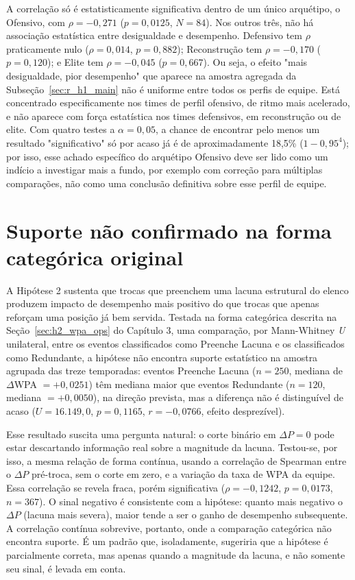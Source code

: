 A correlação só é estatisticamente significativa dentro de um único arquétipo, o Ofensivo, com $\rho = -0{,}271$ ($p = 0{,}0125$, $N = 84$). Nos outros três, não há associação estatística entre desigualdade e desempenho. Defensivo tem $\rho$ praticamente nulo ($\rho = 0{,}014$, $p = 0{,}882$); Reconstrução tem $\rho = -0{,}170$ ($p = 0{,}120$); e Elite tem $\rho = -0{,}045$ ($p = 0{,}667$). Ou seja, o efeito "mais desigualdade, pior desempenho" que aparece na amostra agregada da Subseção~\ref{sec:r_h1_main} não é uniforme entre todos os perfis de equipe. Está concentrado especificamente nos times de perfil ofensivo, de ritmo mais acelerado, e não aparece com força estatística nos times defensivos, em reconstrução ou de elite. Com quatro testes a $\alpha = 0{,}05$, a chance de encontrar pelo menos um resultado "significativo" só por acaso já é de aproximadamente 18,5\% ($1-0{,}95^4$); por isso, esse achado específico do arquétipo Ofensivo deve ser lido como um indício a investigar mais a fundo, por exemplo com correção para múltiplas comparações, não como uma conclusão definitiva sobre esse perfil de equipe.

\section{Suporte não confirmado na forma categórica original}
\label{sec:r_h2}

A Hipótese 2 sustenta que trocas que preenchem uma lacuna estrutural do elenco produzem impacto de desempenho mais positivo do que trocas que apenas reforçam uma posição já bem servida. Testada na forma categórica descrita na Seção~\ref{sec:h2_wpa_ops} do Capítulo 3, uma comparação, por Mann-Whitney \textit{U} unilateral, entre os eventos classificados como Preenche Lacuna e os classificados como Redundante, a hipótese não encontra suporte estatístico na amostra agrupada das treze temporadas: eventos Preenche Lacuna ($n=250$, mediana de $\Delta$WPA $= +0{,}0251$) têm mediana maior que eventos Redundante ($n=120$, mediana $=+0{,}0050$), na direção prevista, mas a diferença não é distinguível de acaso ($U = 16.149{,}0$, $p = 0{,}1165$, $r = -0{,}0766$, efeito desprezível).

Esse resultado suscita uma pergunta natural: o corte binário em $\Delta P = 0$ pode estar descartando informação real sobre a magnitude da lacuna. Testou-se, por isso, a mesma relação de forma contínua, usando a correlação de Spearman entre o $\Delta P$ pré-troca, sem o corte em zero, e a variação da taxa de WPA da equipe. Essa correlação se revela fraca, porém significativa ($\rho = -0{,}1242$, $p = 0{,}0173$, $n = 367$). O sinal negativo é consistente com a hipótese: quanto mais negativo o $\Delta P$ (lacuna mais severa), maior tende a ser o ganho de desempenho subsequente. A correlação contínua sobrevive, portanto, onde a comparação categórica não encontra suporte. É um padrão que, isoladamente, sugeriria que a hipótese é parcialmente correta, mas apenas quando a magnitude da lacuna, e não somente seu sinal, é levada em conta.

